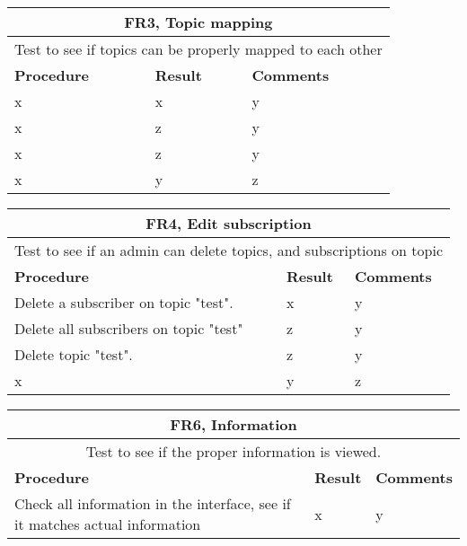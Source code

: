 \begin{table}[ht!]
\begin{tabular}{|m{4cm}|m{2cm}|m{4cm}|}
\hline
\multicolumn{3}{|c|}{\textbf{FR3, Topic mapping}} \\ \hline
\multicolumn{3}{|c|}{{Test to see if topics can be properly mapped to each other}} \\ \hline
\textbf{Procedure} & \textbf{Result} & \textbf{Comments} \\ \hline
x & x & y \\ \hline
x &z&y \\ \hline
x &z&y \\ \hline
x&y&z \\ \hline
\end{tabular}
\end{table}

\begin{table}[ht!]
\begin{tabular}{|m{4cm}|m{2cm}|m{4cm}|}
\hline
\multicolumn{3}{|c|}{\textbf{FR4, Edit subscription}} \\ \hline
\multicolumn{3}{|c|}{{Test to see if an admin can delete topics, and subscriptions on topic}} \\ \hline
\textbf{Procedure} & \textbf{Result} & \textbf{Comments} \\ \hline
Delete a subscriber on topic "test". & x & y \\ \hline
Delete all subscribers on topic "test" &z&y \\ \hline
Delete topic "test". &z&y \\ \hline
x&y&z \\ \hline
\end{tabular}
\end{table}

\begin{table}[ht!]
\begin{tabular}{|m{4cm}|m{2cm}|m{4cm}|}
\hline
\multicolumn{3}{|c|}{\textbf{FR6, Information}} \\ \hline
\multicolumn{3}{|c|}{{Test to see if the proper information is viewed.}} \\ \hline
\textbf{Procedure} & \textbf{Result} & \textbf{Comments} \\ \hline
Check all information in the interface, see if it matches actual information & x & y \\ \hline
\end{tabular}
\end{table}

